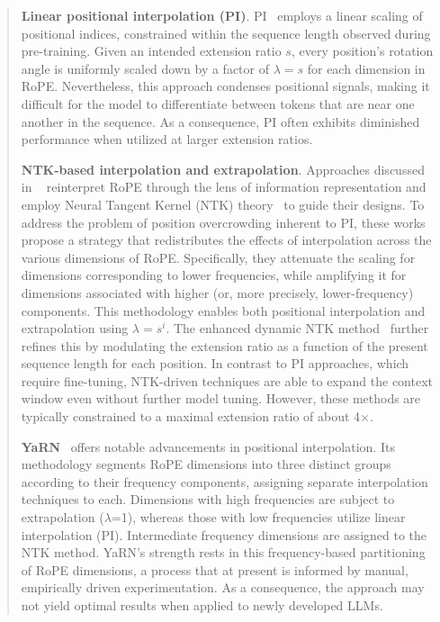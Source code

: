 \begin{abstract}
\textbf{Linear positional interpolation (PI)}. PI~\cite{pi} employs a linear scaling of positional indices, constrained within the sequence length observed during pre-training. Given an intended extension ratio $s$, every position’s rotation angle is uniformly scaled down by a factor of $\lambda=s$ for each dimension in RoPE. Nevertheless, this approach condenses positional signals, making it difficult for the model to differentiate between tokens that are near one another in the sequence. As a consequence, PI often exhibits diminished performance when utilized at larger extension ratios.

\textbf{NTK-based interpolation and extrapolation}. Approaches discussed in ~\cite{ntk,dynamicntk} reinterpret RoPE through the lens of information representation and employ Neural Tangent Kernel (NTK) theory~\cite{jacot2018neural,tancik2020fourier} to guide their designs. To address the problem of position overcrowding inherent to PI, these works propose a strategy that redistributes the effects of interpolation across the various dimensions of RoPE. Specifically, they attenuate the scaling for dimensions corresponding to lower frequencies, while amplifying it for dimensions associated with higher (or, more precisely, lower-frequency) components. This methodology enables both positional interpolation and extrapolation using $\lambda=s^{i}$. The enhanced dynamic NTK method~\cite{dynamicntk} further refines this by modulating the extension ratio as a function of the present sequence length for each position. In contrast to PI approaches, which require fine-tuning, NTK-driven techniques are able to expand the context window even without further model tuning. However, these methods are typically constrained to a maximal extension ratio of about 4$\times$.

\textbf{YaRN}~\cite{yarn} offers notable advancements in positional interpolation. Its methodology segments RoPE dimensions into three distinct groups according to their frequency components, assigning separate interpolation techniques to each. Dimensions with high frequencies are subject to extrapolation ($\lambda$=1), whereas those with low frequencies utilize linear interpolation (PI). Intermediate frequency dimensions are assigned to the NTK method. YaRN's strength rests in this frequency-based partitioning of RoPE dimensions, a process that at present is informed by manual, empirically driven experimentation. As a consequence, the approach may not yield optimal results when applied to newly developed LLMs.


\end{abstract}
